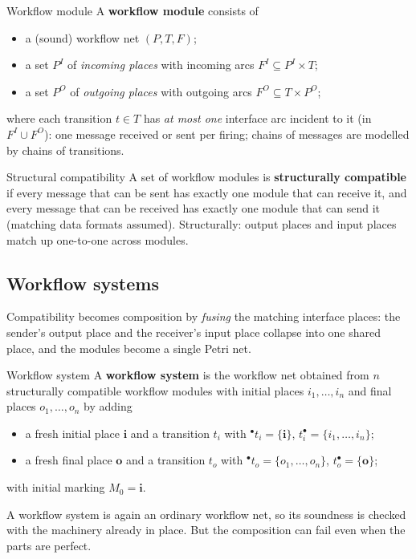 \begin{definitionbox}{Workflow module}
A \textbf{workflow module} consists of
\begin{itemize}
  \item a (sound) workflow net $(P, T, F)$;
  \item a set $P^I$ of \emph{incoming places} with incoming arcs $F^I \subseteq P^I \times T$;
  \item a set $P^O$ of \emph{outgoing places} with outgoing arcs $F^O \subseteq T \times P^O$;
\end{itemize}
where each transition $t \in T$ has \emph{at most one} interface arc incident to it (in $F^I \cup F^O$): one message received or sent per firing; chains of messages are modelled by chains of transitions.
\end{definitionbox}
\begin{definitionbox}{Structural compatibility}
A set of workflow modules is \textbf{structurally compatible} if every message that can be sent has exactly one module that can receive it, and every message that can be received has exactly one module that can send it (matching data formats assumed). Structurally: output places and input places match up one-to-one across modules.
\end{definitionbox}

\subsection{Workflow systems}

Compatibility becomes composition by \emph{fusing} the matching interface places: the sender's output place and the receiver's input place collapse into one shared place, and the modules become a single Petri net.
\begin{definitionbox}{Workflow system}
A \textbf{workflow system} is the workflow net obtained from $n$ structurally compatible workflow modules with initial places $i_1, \dots, i_n$ and final places $o_1, \dots, o_n$ by adding
\begin{itemize}
  \item a fresh initial place $\mathbf{i}$ and a transition $t_i$ with $^{\bullet}t_i = \{\mathbf{i}\}$, $t_i^{\bullet} = \{i_1, \dots, i_n\}$;
  \item a fresh final place $\mathbf{o}$ and a transition $t_o$ with $^{\bullet}t_o = \{o_1, \dots, o_n\}$, $t_o^{\bullet} = \{\mathbf{o}\}$;
\end{itemize}
with initial marking $M_0 = \mathbf{i}$.
\end{definitionbox}
A workflow system is again an ordinary workflow net, so its soundness is checked with the machinery already in place. But the composition can fail even when the parts are perfect.

